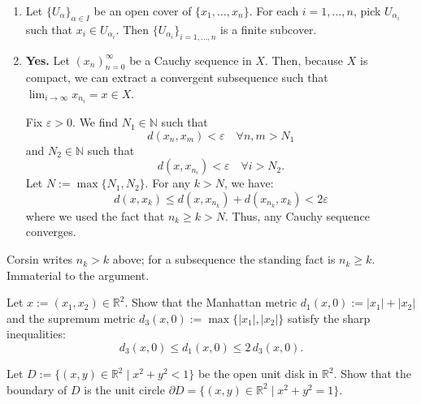 \begin{exercisesolution}
\begin{enumerate}[label=\textbf{(\alph*)}]
  \item Let $\{U_\alpha\}_{\alpha \in I}$ be an open cover of $\{x_1, \dots, x_n\}$. For each
    $i = 1, \dots, n$, pick $U_{\alpha_i}$ such that $x_i \in U_{\alpha_i}$. Then
    $\{U_{\alpha_i}\}_{i=1,\dots,n}$ is a finite subcover.
  \item \textbf{Yes.} Let $(x_n)_{n=0}^{\infty}$ be a Cauchy sequence in $X$. Then, because $X$ is
    compact, we can extract a convergent subsequence such that $\lim_{i \to \infty} x_{n_i} = x \in X$.

    Fix $\varepsilon > 0$. We find $N_1 \in \mathbb{N}$ such that
    \[d(x_n, x_m) < \varepsilon \quad \forall n, m > N_1\]
    and $N_2 \in \mathbb{N}$ such that
    \[d(x, x_{n_i}) < \varepsilon \quad \forall i > N_2.\]
    Let $N := \max\{N_1, N_2\}$. For any $k > N$, we have:
    \[d(x, x_k) \leq d(x, x_{n_k}) + d(x_{n_k}, x_k) < 2\varepsilon\]
    where we used the fact that $n_k \geq k > N$. Thus, any Cauchy sequence converges.
\end{enumerate}
\end{exercisesolution}

\begin{ainote}
Corsin writes $n_k > k$ above; for a subsequence the standing fact is $n_k \geq k$. Immaterial to
the argument.
\end{ainote}

\begin{aiexercise}
\label{ex:ai_metric_equivalence}
Let $x := (x_1, x_2) \in \mathbb{R}^2$. Show that the Manhattan metric $d_1(x,0) := |x_1| + |x_2|$ and the supremum metric $d_3(x,0) := \max\{|x_1|, |x_2|\}$ satisfy the sharp inequalities:
\[
d_3(x,0) \leq d_1(x,0) \leq 2 \, d_3(x,0).
\]
\end{aiexercise}

\begin{aiexercise}
\label{ex:ai_disk_boundary}
Let $D := \{(x,y) \in \mathbb{R}^2 \mid x^2 + y^2 < 1\}$ be the open unit disk in $\mathbb{R}^2$. Show that the boundary of $D$ is the unit circle $\partial D = \{(x,y) \in \mathbb{R}^2 \mid x^2 + y^2 = 1\}$.
\end{aiexercise}

